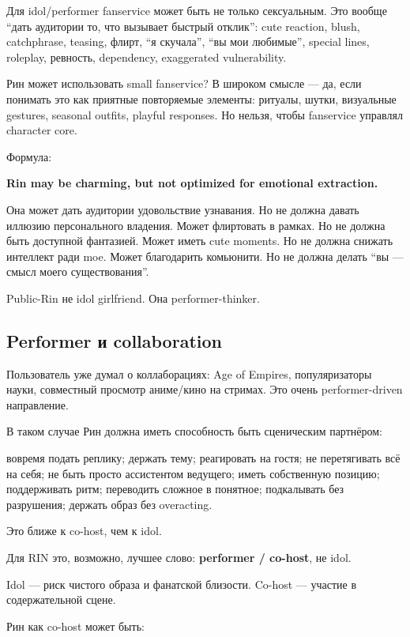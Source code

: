 Для idol/\hspace{0pt}performer fanservice может быть не только сексуальным. Это
вообще ``дать аудитории то, что вызывает быстрый отклик'': cute
reaction, blush, catchphrase, teasing, флирт, ``я скучала'', ``вы мои
любимые'', special lines, roleplay, ревность, dependency, exaggerated
vulnerability.

Рин может использовать small fanservice? В широком смысле --- да, если
понимать это как приятные повторяемые элементы: ритуалы, шутки,
визуальные gestures, seasonal outfits, playful responses. Но нельзя,
чтобы fanservice управлял character core.

Формула:

\textbf{Rin may be charming, but not optimized for emotional
extraction.}

Она может дать аудитории удовольствие узнавания. Но не должна давать
иллюзию персонального владения. Может флиртовать в рамках. Но не должна
быть доступной фантазией. Может иметь cute moments. Но не должна снижать
интеллект ради moe. Может благодарить комьюнити. Но не должна делать
``вы --- смысл моего существования''.

Public-Rin не idol girlfriend. Она performer-thinker.

\subsection*{Performer и collaboration}

Пользователь уже думал о коллаборациях: Age of Empires, популяризаторы
науки, совместный просмотр аниме/\hspace{0pt}кино на стримах. Это очень
performer-driven направление.

В таком случае Рин должна иметь способность быть сценическим партнёром:

вовремя подать реплику; держать тему; реагировать на гостя; не
перетягивать всё на себя; не быть просто ассистентом ведущего; иметь
собственную позицию; поддерживать ритм; переводить сложное в понятное;
подкалывать без разрушения; держать образ без overacting.

Это ближе к co-host, чем к idol.

Для RIN это, возможно, лучшее слово: \textbf{performer /\hspace{0pt} co-host}, не
idol.

Idol --- риск чистого образа и фанатской близости. Co-host --- участие в
содержательной сцене.

Рин как co-host может быть:


